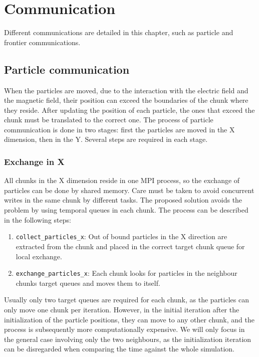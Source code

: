 \chapter{Communication}
\label{ch:comm}

Different communications are detailed in this chapter, such as particle and 
frontier communications.

\section{Particle communication}

When the particles are moved, due to the interaction with the electric field and 
the magnetic field, their position can exceed the boundaries of the chunk where 
they reside. After updating the position of each particle, the ones that exceed 
the chunk must be translated to the correct one. The process of particle 
communication is done in two stages: first the particles are moved in the X 
dimension, then in the Y. Several steps are required in each stage.

\subsection{Exchange in X}
All chunks in the X dimension reside in one MPI process, so the exchange of 
particles can be done by shared memory. Care must be taken to avoid concurrent 
writes in the same chunk by different tasks. The proposed solution avoids the 
problem by using temporal queues in each chunk. The process can be described in 
the following steps:
%
\begin{enumerate}
\item \texttt{collect\_particles\_x}: Out of bound particles in the X direction 
are extracted from the chunk and placed in the correct target chunk queue for 
local exchange.
\item \texttt{exchange\_particles\_x}: Each chunk looks for particles in the 
neighbour chunks target queues and moves them to itself.
\end{enumerate}
%
Usually only two target queues are required for each chunk, as the particles can 
only move one chunk per iteration. However, in the initial iteration after the 
initialization of the particle positions, they can move to any other chunk, and 
the process is subsequently more computationally expensive. We will only focus 
in the general case involving only the two neighbours, as the initialization 
iteration can be disregarded when comparing the time against the whole 
simulation.

